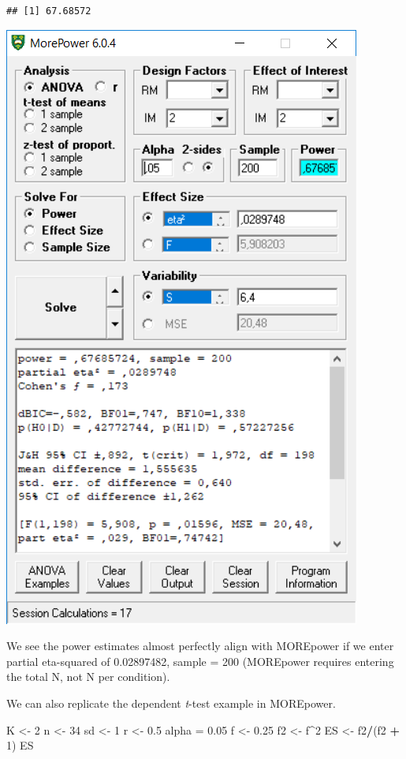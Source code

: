 \documentclass[
]{book}
\newenvironment{Shaded}{\begin{snugshade}}{\end{snugshade}}
\newcommand{\DecValTok}[1]{\textcolor[rgb]{0.00,0.00,0.81}{#1}}
\newcommand{\FloatTok}[1]{\textcolor[rgb]{0.00,0.00,0.81}{#1}}
\newcommand{\NormalTok}[1]{#1}
\newcommand{\OperatorTok}[1]{\textcolor[rgb]{0.81,0.36,0.00}{\textbf{#1}}}
\newcommand{\StringTok}[1]{\textcolor[rgb]{0.31,0.60,0.02}{#1}}
\begin{document}
\begin{verbatim}
## [1] 67.68572
\end{verbatim}

\includegraphics{screenshots/morepower_1.png}

We see the power estimates almost perfectly align with MOREpower if we enter partial eta-squared of 0.02897482, sample = 200 (MOREpower requires entering the total N, not N per condition).

We can also replicate the dependent \emph{t}-test example in MOREpower.

\begin{Shaded}
\begin{Highlighting}[]
\NormalTok{K <-}\StringTok{ }\DecValTok{2}
\NormalTok{n <-}\StringTok{ }\DecValTok{34}
\NormalTok{sd <-}\StringTok{ }\DecValTok{1}
\NormalTok{r <-}\StringTok{ }\FloatTok{0.5}
\NormalTok{alpha =}\StringTok{ }\FloatTok{0.05}
\NormalTok{f <-}\StringTok{ }\FloatTok{0.25}
\NormalTok{f2 <-}\StringTok{ }\NormalTok{f}\OperatorTok{^}\DecValTok{2}
\NormalTok{ES <-}\StringTok{ }\NormalTok{f2}\OperatorTok{/}\NormalTok{(f2 }\OperatorTok{+}\StringTok{ }\DecValTok{1}\NormalTok{)}
\NormalTok{ES}
\end{Highlighting}
\end{Shaded}
\end{document}
